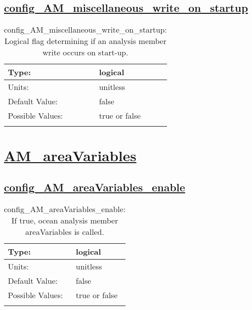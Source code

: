\subsection[config\_AM\_miscellaneous\_write\_on\_startup]{\hyperref[sec:nm_tab_AM_miscellaneous]{config\_AM\_miscellaneous\_write\_on\_startup}}
\label{subsec:nm_sec_config_AM_miscellaneous_write_on_startup}
\begin{center}
\begin{longtable}{| p{2.0in} || p{4.0in} |}
    \hline
    Type: & logical \\
    \hline
    Units: & \si{unitless} \\
    \hline
    Default Value: & false \\
    \hline
    Possible Values: & true or false \\
    \hline
    \caption{config\_AM\_miscellaneous\_write\_on\_startup: Logical flag determining if an analysis member write occurs on start-up.}
\end{longtable}
\end{center}
\section[AM\_areaVariables]{\hyperref[sec:nm_tab_AM_areaVariables]{AM\_areaVariables}}
\label{sec:nm_sec_AM_areaVariables}
\subsection[config\_AM\_areaVariables\_enable]{\hyperref[sec:nm_tab_AM_areaVariables]{config\_AM\_areaVariables\_enable}}
\label{subsec:nm_sec_config_AM_areaVariables_enable}
\begin{center}
\begin{longtable}{| p{2.0in} || p{4.0in} |}
    \hline
    Type: & logical \\
    \hline
    Units: & \si{unitless} \\
    \hline
    Default Value: & false \\
    \hline
    Possible Values: & true or false \\
    \hline
    \caption{config\_AM\_areaVariables\_enable: If true, ocean analysis member areaVariables is called.}
\end{longtable}
\end{center}
